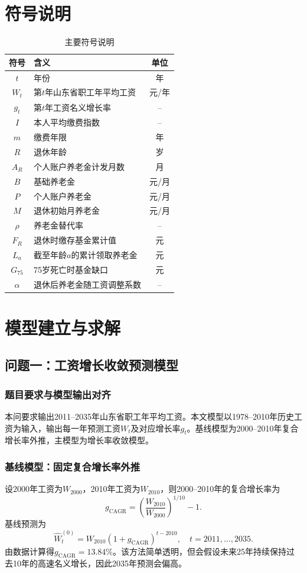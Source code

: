 \documentclass[UTF8,12pt,a4paper]{ctexart}
\begin{document}
\section{符号说明}
\begin{table}[H]
\centering
\caption{主要符号说明}
\begin{tabular}{clc}
\toprule
符号 & 含义 & 单位\\
\midrule
$t$ & 年份 & 年\\
$W_t$ & 第$t$年山东省职工年平均工资 & 元/年\\
$g_t$ & 第$t$年工资名义增长率 & --\\
$I$ & 本人平均缴费指数 & --\\
$m$ & 缴费年限 & 年\\
$R$ & 退休年龄 & 岁\\
$A_R$ & 个人账户养老金计发月数 & 月\\
$B$ & 基础养老金 & 元/月\\
$P$ & 个人账户养老金 & 元/月\\
$M$ & 退休初始月养老金 & 元/月\\
$\rho$ & 养老金替代率 & --\\
$F_R$ & 退休时缴存基金累计值 & 元\\
$L_a$ & 截至年龄$a$的累计领取养老金 & 元\\
$G_{75}$ & 75岁死亡时基金缺口 & 元\\
$\alpha$ & 退休后养老金随工资调整系数 & --\\
\bottomrule
\end{tabular}
\end{table}

\section{模型建立与求解}
\subsection{问题一：工资增长收敛预测模型}
\subsubsection{题目要求与模型输出对齐}
本问要求输出2011--2035年山东省职工年平均工资。本文模型以1978--2010年历史工资为输入，输出每一年预测工资$W_t$及对应增长率$g_t$。基线模型为2000--2010年复合增长率外推，主模型为增长率收敛模型。

\subsubsection{基线模型：固定复合增长率外推}
设2000年工资为$W_{2000}$，2010年工资为$W_{2010}$，则2000--2010年的复合增长率为
\begin{equation}
 g_{\text{CAGR}}=\left(\frac{W_{2010}}{W_{2000}}\right)^{1/10}-1.
\end{equation}
基线预测为
\begin{equation}
 \widehat W_t^{(0)}=W_{2010}(1+g_{\text{CAGR}})^{t-2010},\quad t=2011,\ldots,2035.
\end{equation}
由数据计算得$g_{\text{CAGR}}=13.84\%$。该方法简单透明，但会假设未来25年持续保持过去10年的高速名义增长，因此2035年预测会偏高。
\end{document}
